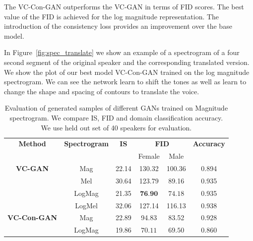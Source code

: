 The VC-Con-GAN outperforms the VC-GAN in terms of FID scores. The best value of the FID is achieved for the log magnitude representation. The introduction of the consistency loss provides an improvement over the base model.

In Figure~\ref{fig:spec_translate} we show an example of a spectrogram of a four second segment of the original speaker and the corresponding translated version. We show the plot of our best model VC-Con-GAN trained on the log magnitude spectrogram. We can see the network learn to shift the tones as well as learn to change the shape and spacing of contours to translate the voice. 
\begin{table}[h]
    \centering
    \begin{tabular}{cccccc}
    \toprule
    \textbf{Method}     & \textbf{Spectrogram} & \textbf{IS} & \multicolumn{2}{c}{\textbf{FID}} & \textbf{Accuracy}\\
    & & & Female & Male & \\
    \midrule
     \textbf{VC-GAN}    & Mag & 22.14 &130.32 & 100.36 & 0.894 \\
         & Mel & 30.64& 123.79&89.16 & 0.935\\
         & LogMag &21.35 &$\textbf{76.90}$ &$\mathbf{74.18}$& 0.935\\
         & LogMel &32.06& 127.14&116.13& $\mathbf{0.938}$\\
    \midrule
     \textbf{VC-Con-GAN}    & Mag & 22.89 &94.83 & 83.52 &  $\mathbf{0.928}$\\
         & LogMag & 19.86 & $\mathbf{70.11}$& $\mathbf{69.50}$ & 0.860\\
    \bottomrule 
    \end{tabular}
    \caption[Evaluation of generated samples of different GANs trained on Magnitude spectrogram.]{Evaluation of generated samples of different GANs trained on Magnitude spectrogram. We compare IS, FID and domain classification accuracy. We use held out set of 40 speakers for evaluation.}
    \label{tab:eval_gan_mag}
\end{table}

